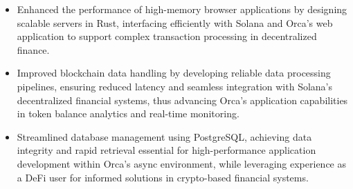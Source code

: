 \documentclass[a4paper,10pt]{article}
\begin{document}
\begin{itemize}
    \item Enhanced the performance of high-memory browser applications by designing scalable servers in Rust, interfacing efficiently with Solana and Orca's web application to support complex transaction processing in decentralized finance.
\item Improved blockchain data handling by developing reliable data processing pipelines, ensuring reduced latency and seamless integration with Solana's decentralized financial systems, thus advancing Orca's application capabilities in token balance analytics and real-time monitoring.
\item Streamlined database management using PostgreSQL, achieving data integrity and rapid retrieval essential for high-performance application development within Orca's async environment, while leveraging experience as a DeFi user for informed solutions in crypto-based financial systems.
\end{itemize}
\end{document}

